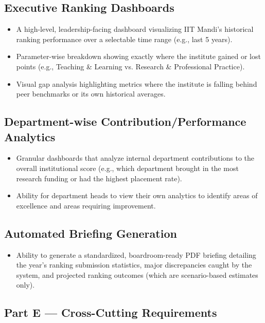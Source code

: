 \documentclass[11pt]{article}
\begin{document}
\subsection{Executive Ranking Dashboards}
\begin{itemize}[leftmargin=1.4em, itemsep=3pt]
\item A high-level, leadership-facing dashboard visualizing IIT Mandi's historical ranking performance over a selectable time range (e.g., last 5 years).
\item Parameter-wise breakdown showing exactly where the institute gained or lost points (e.g., Teaching \& Learning vs. Research \& Professional Practice).
\item Visual gap analysis highlighting metrics where the institute is falling behind peer benchmarks or its own historical averages.
\end{itemize}

\subsection{Department-wise Contribution/Performance Analytics}
\begin{itemize}[leftmargin=1.4em, itemsep=3pt]
\item Granular dashboards that analyze internal department contributions to the overall institutional score (e.g., which department brought in the most research funding or had the highest placement rate).
\item Ability for department heads to view their own analytics to identify areas of excellence and areas requiring improvement.
\end{itemize}

\subsection{Automated Briefing Generation}
\begin{itemize}[leftmargin=1.4em, itemsep=3pt]
\item Ability to generate a standardized, boardroom-ready PDF briefing detailing the year's ranking submission statistics, major discrepancies caught by the system, and projected ranking outcomes (which are scenario-based estimates only).
\end{itemize}

\subsection*{Part E --- Cross-Cutting Requirements}
\end{document}
